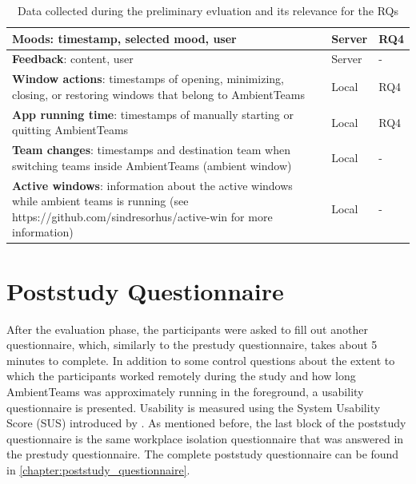 \begin{table}[h]
\begin{tabular}{|p{8cm}|p{1cm}|p{2cm}|}
        \hline
        \textbf{Moods}: timestamp, selected mood, user                                                                                                                     & Server  & RQ4       \\
        \hline
        \textbf{Feedback}: content, user                                                                                                                                   & Server  & -         \\
        \hline
        \textbf{Window actions}:  timestamps of opening, minimizing, closing, or restoring windows that belong to AmbientTeams                                             & Local   & RQ4       \\
        \hline
        \textbf{App running time}:  timestamps of manually starting or quitting AmbientTeams                                                                               & Local   & RQ4       \\
        \hline
        \textbf{Team changes}: timestamps and destination team when switching teams inside AmbientTeams (ambient window)                                                   & Local   & -         \\
        \hline
        \textbf{Active windows}: information about the active windows while ambient teams is running (see https://github.com/sindresorhus/active-win for more information) & Local   & -         \\
        \hline
    \end{tabular}
    \caption{Data collected during the preliminary evluation and its relevance for the RQs}
    \label{table:data}
\end{table}


\section{Poststudy Questionnaire}
\label{section:poststudy_questionnaire}
After the evaluation phase, the participants were asked to fill out another questionnaire, which, similarly to the prestudy questionnaire, takes about 5 minutes to complete. In addition to some control questions about the extent to which the participants worked remotely during the study and how long AmbientTeams was approximately running in the foreground, a usability questionnaire is presented. Usability is measured using the System Usability Score (SUS) introduced by \textcite{brooke1996sus}. As mentioned before, the last block of the poststudy questionnaire is the same workplace isolation questionnaire that was answered in the prestudy questionnaire. The complete poststudy questionnaire can be found in \autoref{chapter:poststudy_questionnaire}.

